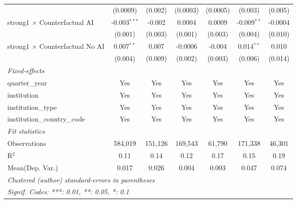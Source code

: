 \begin{tabular}{lcccccc}
                                          & (0.0009)       & (0.002)       & (0.0003)      & (0.0005)      & (0.003)       & (0.005)\\   
   strong1 $\times$ Counterfactual AI     & -0.003$^{***}$ & -0.002        & 0.0004        & 0.0009        & -0.009$^{**}$ & -0.0004\\   
                                          & (0.001)        & (0.003)       & (0.001)       & (0.003)       & (0.004)       & (0.010)\\   
   strong1 $\times$ Counterfactual No AI  & 0.007$^{**}$   & 0.007         & -0.0006       & -0.004        & 0.014$^{**}$  & 0.010\\   
                                          & (0.004)        & (0.009)       & (0.002)       & (0.003)       & (0.006)       & (0.014)\\   
   \midrule
   \emph{Fixed-effects}\\
   quarter\_year                          & Yes            & Yes           & Yes           & Yes           & Yes           & Yes\\  
   institution                            & Yes            & Yes           & Yes           & Yes           & Yes           & Yes\\  
   institution\_type                      & Yes            & Yes           & Yes           & Yes           & Yes           & Yes\\  
   institution\_country\_code             & Yes            & Yes           & Yes           & Yes           & Yes           & Yes\\  
   \midrule
   \emph{Fit statistics}\\
   Observations                           & 584,019        & 151,126       & 169,543       & 61,790        & 171,338       & 46,301\\  
   R$^2$                                  & 0.11           & 0.14          & 0.12          & 0.17          & 0.15          & 0.19\\  
Mean(Dep. Var.) & 0.017 & 0.026 & 0.004 & 0.003 & 0.047 & 0.074 \\
   \midrule \midrule
   \multicolumn{7}{l}{\emph{Clustered (author) standard-errors in parentheses}}\\
   \multicolumn{7}{l}{\emph{Signif. Codes: ***: 0.01, **: 0.05, *: 0.1}}\\
\end{tabular}
\par\endgroup
